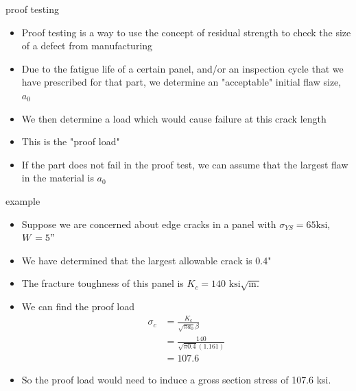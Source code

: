 \documentclass[10pt]{beamer}
\begin{document}
\begin{frame}{proof testing}
	\begin{itemize}[<+->]
		\item Proof testing is a way to use the concept of residual strength to check the size of a defect from manufacturing
		\item Due to the fatigue life of a certain panel, and/or an inspection cycle that we have prescribed for that part, we determine an "acceptable" initial flaw size, $a_0$
		\item We then determine a load which would cause failure at this crack length
		\item This is the "proof load"
		\item If the part does not fail in the proof test, we can assume that the largest flaw in the material is $a_0$
	\end{itemize}
\end{frame}

\begin{frame}{example}
	\begin{itemize}
		\item Suppose we are concerned about edge cracks in a panel with $\sigma_{YS} = 65 \text{ksi}$, $W=5"$
		\item We have determined that the largest allowable crack is 0.4"
		\item The fracture toughness of this panel is $K_c = 140 \text{ ksi} \sqrt{\text{in.}}$
		\item We can find the proof load
		\begin{align*}
		\sigma_c &= \frac{K_c}{\sqrt{\pi a_0} \beta}\\
		&= \frac{140}{\sqrt{\pi 0.4} (1.161)}\\
		&= 107.6
		\end{align*}
		\item So the proof load would need to induce a gross section stress of 107.6 ksi.
	\end{itemize}
\end{frame}
\end{document}
